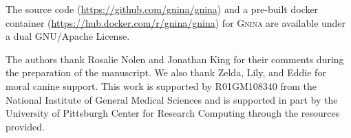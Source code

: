 \documentclass[journal=jcisd8,manuscript=article]{achemso}
\begin{document}
The source code (\url{https://github.com/gnina/gnina}) and a pre-built docker container (\url{https://hub.docker.com/r/gnina/gnina}) for \textsc{Gnina} are available under a dual GNU/Apache License.


\begin{acknowledgement}
The authors thank Rosalie Nolen and Jonathan King for their comments during the preparation of the manuscript. We also thank Zelda, Lily, and Eddie for moral canine support.
This work is supported by R01GM108340 from the National Institute of General Medical Sciences and is supported in part by the University of Pittsburgh Center for Research Computing through the resources provided.



\end{acknowledgement}

\begin{suppinfo}
  


\end{suppinfo}


\end{document}
